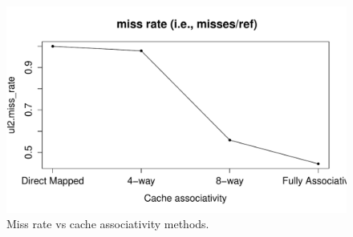 \documentclass[10pt]{scrartcl}
\begin{document}
\begin{figure}[!htb]
\endminipage
{}%
  \includegraphics[trim={1cm 1.2cm 0 1.8cm},clip,width=\linewidth]{NewPlots/plot_A_G_miss_rate}
\endminipage
\caption{Miss rate vs cache associativity methods.}\label{fig:cache-a_miss_rate}
\end{figure}

\FloatBarrier
\end{document}
